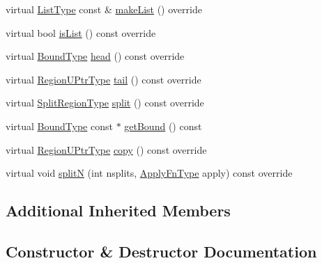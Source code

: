 \begin{DoxyCompactItemize}
\item 
virtual \hyperlink{structvt_1_1group_1_1region_1_1_region_a4e35b2fc6dca06aca0b7bc0e19b35c5a}{List\+Type} const  \& \hyperlink{structvt_1_1group_1_1region_1_1_shallow_list_aecf1849757306e2d8a3c339a4bdb6453}{make\+List} () override
\item 
virtual bool \hyperlink{structvt_1_1group_1_1region_1_1_shallow_list_a5d83012cacf2a8ebeb3edb55603fceaa}{is\+List} () const override
\item 
virtual \hyperlink{structvt_1_1group_1_1region_1_1_region_abf426ff85bed72c1c6524fad6a9f1751}{Bound\+Type} \hyperlink{structvt_1_1group_1_1region_1_1_shallow_list_a249b65b9cc1a44131cf52488baea9a41}{head} () const override
\item 
virtual \hyperlink{structvt_1_1group_1_1region_1_1_region_ae5f42cf159116a3cf8bd65423eb01037}{Region\+U\+Ptr\+Type} \hyperlink{structvt_1_1group_1_1region_1_1_shallow_list_a358a60631cc0d1dd55d72af82e287014}{tail} () const override
\item 
virtual \hyperlink{structvt_1_1group_1_1region_1_1_region_ab8d05c0978c7f38292a9ed5a15498a4b}{Split\+Region\+Type} \hyperlink{structvt_1_1group_1_1region_1_1_shallow_list_a766a07e9f1c8580a1b986a71bb80ea66}{split} () const override
\item 
virtual \hyperlink{structvt_1_1group_1_1region_1_1_region_abf426ff85bed72c1c6524fad6a9f1751}{Bound\+Type} const  $\ast$ \hyperlink{structvt_1_1group_1_1region_1_1_shallow_list_a3ca4276a7602a1ed44f02dfa7e600e88}{get\+Bound} () const
\item 
virtual \hyperlink{structvt_1_1group_1_1region_1_1_region_ae5f42cf159116a3cf8bd65423eb01037}{Region\+U\+Ptr\+Type} \hyperlink{structvt_1_1group_1_1region_1_1_shallow_list_a43434547454d02f9069873282675058f}{copy} () const override
\item 
virtual void \hyperlink{structvt_1_1group_1_1region_1_1_shallow_list_ac41946e0f130b3d4b42f9edbe20f3605}{splitN} (int nsplits, \hyperlink{structvt_1_1group_1_1region_1_1_region_a7c9e99b1157d2fe2f3e6fc36a1463a96}{Apply\+Fn\+Type} apply) const override
\end{DoxyCompactItemize}
\subsection*{Additional Inherited Members}


\subsection{Constructor \& Destructor Documentation}
\mbox{\label{structvt_1_1group_1_1region_1_1_shallow_list_a603d4964e6b51c9883b3f7ef1f7de997}} 
